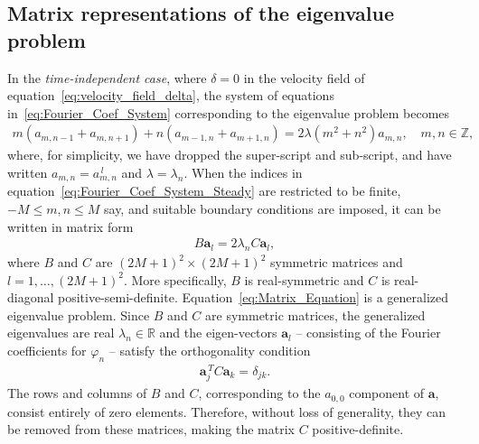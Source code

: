 \documentclass[leqno,onefignum,onetabnum]{siamltex1213}
\newcommand{\veca}{\boldsymbol{a}}
\begin{document}
\subsection{Matrix representations of the eigenvalue problem}
%
In the \emph{time-independent case}, where $\delta=0$ in the velocity field
of equation~\eqref{eq:velocity_field_delta}, the system of equations
in~\eqref{eq:Fourier_Coef_System} corresponding to the eigenvalue
problem 
becomes 
%
\begin{align}\label{eq:Fourier_Coef_System_Steady}
  m(a_{m,n-1}+a_{m,n+1})+n(a_{m-1,n}+a_{m+1,n})=2\lambda(m^2+n^2)a_{m,n},
  \quad m,n\in\mathbb{Z},
\end{align}
%
where, for simplicity, we have dropped the super-script and
sub-script, and have written $a_{m,n}=a^{\,l}_{m,n}$ and
$\lambda=\lambda_n$. When the indices in
equation~\eqref{eq:Fourier_Coef_System_Steady} are restricted to be
finite, 
$-M\leq m,n\leq M$ say, and suitable boundary conditions are imposed, it can
be written in matrix form   
%
\begin{align}\label{eq:Matrix_Equation}
  B\veca_l=2\lambda_n C\veca_l,
\end{align}
%
where $B$ and $C$ are $(2M+1)^2\times(2M+1)^2$ symmetric matrices and
$l=1,\ldots,(2M+1)^2$. More specifically, $B$ is real-symmetric and $C$ is
real-diagonal
positive-semi-definite. Equation~\eqref{eq:Matrix_Equation} is a
generalized eigenvalue problem. Since 
$B$ and $C$ are symmetric matrices, the generalized eigenvalues are
real $\lambda_n\in\mathbb{R}$ and the eigen-vectors $\veca_l$ -- consisting
of the Fourier coefficients for $\varphi_n$ -- satisfy the orthogonality
condition 
%
\begin{align}\label{eq:Matrix_Ortho}
  \veca_j^{\,T}C\veca_k=\delta_{jk}.
\end{align}
%
The rows and columns of $B$ and $C$, corresponding to the $a_{0,0}$
component of $\veca$, consist entirely of zero elements. Therefore,
without loss of generality, they can be removed from these matrices,
making the matrix $C$ positive-definite. 
\end{document}
